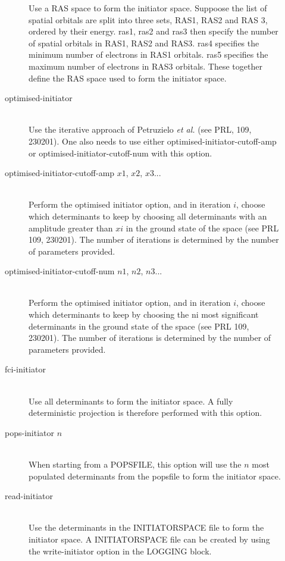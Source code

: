 \documentclass[a4paper,notitlepage,dvipsnames]{scrreprt}
\newcommand\codeitem[1]{\needspace{1.5\baselineskip}\item[\textnormal{\ttfamily #1 \nopagebreak}] \hfill \\ \nopagebreak}
\begin{document}
\begin{description}
\begin{description}
    Use a RAS space to form the initiator space. Suppoose the list of spatial
    orbitals are split into three sets, RAS1, RAS2 and RAS 3, ordered
    by their energy. ras1, ras2 and ras3 then specify the number of
    spatial orbitals in RAS1, RAS2 and RAS3. ras4 specifies the minimum
    number of electrons in RAS1 orbitals. ras5 specifies the maximum
    number of electrons in RAS3 orbitals. These together define the RAS
    space used to form the initiator space.
    \codeitem{optimised-initiator}
    Use the iterative approach of Petruzielo \emph{et al.} (see PRL,
    109, 230201). One also needs to use either optimised-initiator-cutoff-amp
    or optimised-initiator-cutoff-num with this option.
    \codeitem{optimised-initiator-cutoff-amp $x1$, $x2$, $x3$...}
    Perform the optimised initiator option, and in iteration $i$, choose
    which determinants to keep by choosing all determinants with an
    amplitude greater than $xi$ in the ground state of the space (see
    PRL 109, 230201). The number of iterations is determined by the
    number of parameters provided.
    \codeitem{optimised-initiator-cutoff-num $n1$, $n2$, $n3$...}
    Perform the optimised initiator option, and in iteration $i$, choose
    which determinants to keep by choosing the ni most significant
    determinants in the ground state of the space (see PRL 109, 230201).
    The number of iterations is determined by the number of parameters
    provided.
    \codeitem{fci-initiator}
    Use all determinants to form the initiator space. A fully deterministic
    projection is therefore performed with this option.
    \codeitem{pops-initiator $n$}
    When starting from a POPSFILE, this option will use the $n$ most
    populated determinants from the popsfile to form the initiator space.
    \codeitem{read-initiator}
    Use the determinants in the INITIATORSPACE file to form the initiator space.
    A INITIATORSPACE file can be created by using the write-initiator option in
    the LOGGING block.
    \end{description}
  \end{description}
\end{document}
